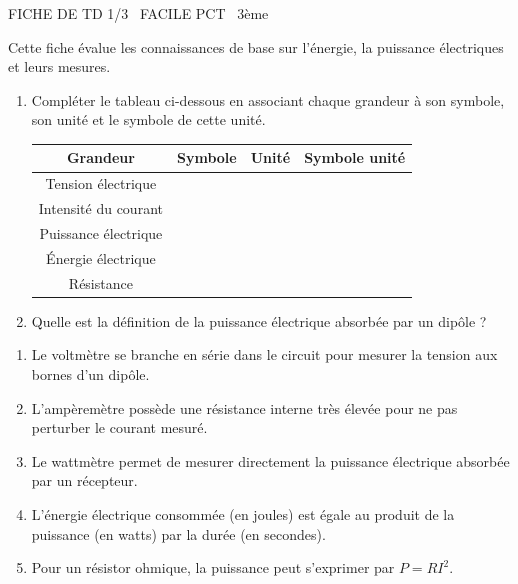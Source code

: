 \documentclass[11pt]{article}
\begin{document}
\begin{tcolorbox}[enhanced,colback=popink,colframe=popink,arc=10pt,boxrule=0pt,left=12pt,right=12pt,top=9pt,bottom=9pt]
{\color{white}\popxbold\small FICHE DE TD 1/3 \textbullet\ FACILE \hfill PCT \textbullet\ 3ème\par}
\end{tcolorbox}
\vspace{4pt}
Cette fiche évalue les connaissances de base sur l'énergie, la puissance électriques et leurs mesures.

\begin{exercice}
\begin{enumerate}
    \item Compléter le tableau ci-dessous en associant chaque grandeur à son symbole, son unité et le symbole de cette unité.
    \begin{tabular}{|c|c|c|c|}
    \hline
    \textbf{Grandeur} & \textbf{Symbole} & \textbf{Unité} & \textbf{Symbole unité} \\ \hline
    Tension électrique & & & \\ \hline
    Intensité du courant & & & \\ \hline
    Puissance électrique & & & \\ \hline
    Énergie électrique & & & \\ \hline
    Résistance & & & \\ \hline
    \end{tabular}
    \item Quelle est la définition de la puissance électrique absorbée par un dipôle ?
\end{enumerate}
\end{exercice}

\begin{exercice}
\begin{enumerate}
    \item Le voltmètre se branche en série dans le circuit pour mesurer la tension aux bornes d'un dipôle.
    \item L'ampèremètre possède une résistance interne très élevée pour ne pas perturber le courant mesuré.
    \item Le wattmètre permet de mesurer directement la puissance électrique absorbée par un récepteur.
    \item L'énergie électrique consommée (en joules) est égale au produit de la puissance (en watts) par la durée (en secondes).
    \item Pour un résistor ohmique, la puissance peut s'exprimer par $P = R I^2$.
\end{enumerate}
\end{exercice}
\end{document}
